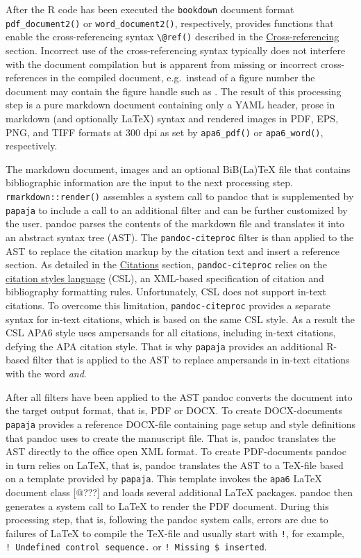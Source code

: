 \documentclass[man,floatsintext]{apa6}
\theoremstyle{definition}
\theoremstyle{definition}
\theoremstyle{definition}
\theoremstyle{remark}
\begin{document}
After the R code has been executed the \texttt{bookdown} document format
\texttt{pdf\_document2()} or \texttt{word\_document2()}, respectively,
provides functions that enable the cross-referencing syntax
\texttt{\textbackslash{}@ref()} described in the
\protect\hyperlink{cross-referencing}{Cross-referencing} section.
Incorrect use of the cross-referencing syntax typically does not
interfere with the document compilation but is apparent from missing or
incorrect cross-references in the compiled document, e.g.~instead of a
figure number the document may contain the figure handle such as
\texttt{\label{fig:my-figure}}. The result of this processing step is a pure
markdown document containing only a YAML header, prose in markdown (and
optionally LaTeX) syntax and rendered images in PDF, EPS, PNG, and TIFF
formats at 300 dpi as set by \texttt{apa6\_pdf()} or
\texttt{apa6\_word()}, respectively.

The markdown document, images and an optional BiB(La)TeX file that
contains bibliographic information are the input to the next processing
step. \texttt{rmarkdown::render()} assembles a system call to pandoc
that is supplemented by \texttt{papaja} to include a call to an
additional filter and can be further customized by the user. pandoc
parses the contents of the markdown file and translates it into an
abstract syntax tree (AST). The \texttt{pandoc-citeproc} filter is than
applied to the AST to replace the citation markup by the citation text
and insert a reference section. As detailed in the
\protect\hyperlink{citations}{Citations} section,
\texttt{pandoc-citeproc} relies on the
\href{http://citationstyles.org/}{citation styles language} (CSL), an
XML-based specification of citation and bibliography formatting rules.
Unfortunately, CSL does not support in-text citations. To overcome this
limitation, \texttt{pandoc-citeproc} provides a separate syntax for
in-text citations, which is based on the same CSL style. As a result the
CSL APA6 style uses ampersands for all citations, including in-text
citations, defying the APA citation style. That is why \texttt{papaja}
provides an additional R-based filter that is applied to the AST to
replace ampersands in in-text citations with the word \emph{and}.

After all filters have been applied to the AST pandoc converts the
document into the target output format, that is, PDF or DOCX. To create
DOCX-documents \texttt{papaja} provides a reference DOCX-file containing
page setup and style definitions that pandoc uses to create the
manuscript file. That is, pandoc translates the AST directly to the
office open XML format. To create PDF-documents pandoc in turn relies on
LaTeX, that is, pandoc translates the AST to a TeX-file based on a
template provided by \texttt{papaja}. This template invokes the
\texttt{apa6} LaTeX document class {[}@???{]} and loads several
additional LaTeX packages. pandoc then generates a system call to LaTeX
to render the PDF document. During this processing step, that is,
following the pandoc system calls, errors are due to failures of LaTeX
to compile the TeX-file and usually start with \texttt{!}, for example,
\texttt{!\ Undefined\ control\ sequence.} or
\texttt{!\ Missing\ \$\ inserted}.
\end{document}
